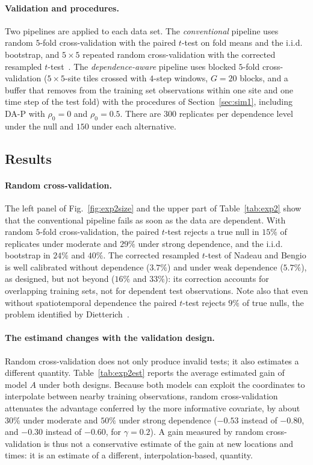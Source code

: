 \paragraph{Validation and procedures.} Two pipelines are applied to each data set. The \emph{conventional} pipeline uses random $5$-fold cross-validation with the paired $t$-test on fold means and the i.i.d. bootstrap, and $5\times5$ repeated random cross-validation with the corrected resampled $t$-test~\cite{nadeau2003}. The \emph{dependence-aware} pipeline uses blocked $5$-fold cross-validation ($5\times5$-site tiles crossed with $4$-step windows, $G=20$ blocks, and a buffer that removes from the training set observations within one site and one time step of the test fold) with the procedures of Section~\ref{sec:sim1}, including DA-P with $\rho_0=0$ and $\rho_0=0.5$. There are $300$ replicates per dependence level under the null and $150$ under each alternative.

\subsection{Results}

\paragraph{Random cross-validation.} The left panel of Fig.~\ref{fig:exp2size} and the upper part of Table~\ref{tab:exp2} show that the conventional pipeline fails as soon as the data are dependent. With random $5$-fold cross-validation, the paired $t$-test rejects a true null in $15\%$ of replicates under moderate and $29\%$ under strong dependence, and the i.i.d. bootstrap in $24\%$ and $40\%$. The corrected resampled $t$-test of Nadeau and Bengio is well calibrated without dependence ($3.7\%$) and under weak dependence ($5.7\%$), as designed, but not beyond ($16\%$ and $33\%$): its correction accounts for overlapping training sets, not for dependent test observations. Note also that even without spatiotemporal dependence the paired $t$-test rejects $9\%$ of true nulls, the problem identified by Dietterich~\cite{dietterich1998}.

\paragraph{The estimand changes with the validation design.} Random cross-validation does not only produce invalid tests; it also estimates a different quantity. Table~\ref{tab:exp2est} reports the average estimated gain of model $A$ under both designs. Because both models can exploit the coordinates to interpolate between nearby training observations, random cross-validation attenuates the advantage conferred by the more informative covariate, by about $30\%$ under moderate and $50\%$ under strong dependence ($-0.53$ instead of $-0.80$, and $-0.30$ instead of $-0.60$, for $\gamma=0.2$). A gain measured by random cross-validation is thus not a conservative estimate of the gain at new locations and times: it is an estimate of a different, interpolation-based, quantity.

